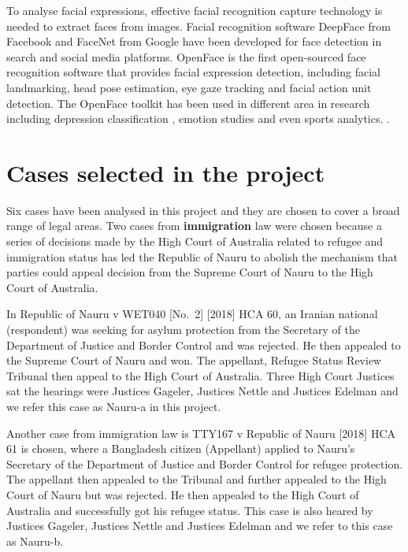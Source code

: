 \documentclass{monashthesis}
\begin{document}
To analyse facial expressions, effective facial recognition capture technology is needed to extract faces from images. Facial recognition software DeepFace \autocite{taigman2014deepface} from Facebook and FaceNet \autocite{schroff2015facenet} from Google have been developed for face detection in search and social media platforms. OpenFace \autocite{baltrusaitis2018openface} is the first open-sourced face recognition software that provides facial expression detection, including facial landmarking, head pose estimation, eye gaze tracking and facial action unit detection. The OpenFace toolkit has been used in different area in research including depression classification \autocites{yang2016decision}{nasir2016multimodal}, emotion studies \autocites{Pan2018}{Nasir2016}{Huber2018} and even sports analytics. \autocite{kovalchik2018going}.

\hypertarget{cases-selected-in-the-project}{%
\section{Cases selected in the project}\label{cases-selected-in-the-project}}

Six cases have been analysed in this project and they are chosen to cover a broad range of legal areas. Two cases from \textbf{immigration} law were chosen because a series of decisions made by the High Court of Australia related to refugee and immigration status has led the Republic of Nauru to abolish the mechanism that parties could appeal decision from the Supreme Court of Nauru to the High Court of Australia.

In Republic of Nauru v WET040 {[}No.~2{]} {[}2018{]} HCA 60, an Iranian national (respondent) was seeking for asylum protection from the Secretary of the Department of Justice and Border Control and was rejected. He then appealed to the Supreme Court of Nauru and won. The appellant, Refugee Status Review Tribunal then appeal to the High Court of Australia. Three High Court Justices sat the hearings were Justices Gageler, Justices Nettle and Justices Edelman and we refer this case as Nauru-a in this project.

Another case from immigration law is TTY167 v Republic of Nauru {[}2018{]} HCA 61 is chosen, where a Bangladesh citizen (Appellant) applied to Nauru's Secretary of the Department of Justice and Border Control for refugee protection. The appellant then appealed to the Tribunal and further appealed to the High Court of Nauru but was rejected. He then appealed to the High Court of Australia and successfully got his refugee status. This case is also heared by Justices Gageler, Justices Nettle and Justices Edelman and we refer to this case as Nauru-b.
\end{document}
